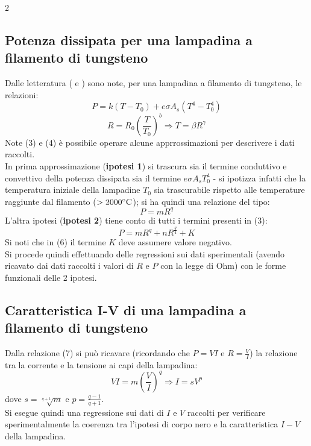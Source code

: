 \documentclass{article}
\begin{document}
\begin{multicols}{2}
\subsection{Potenza dissipata per una lampadina a filamento di tungsteno}
Dalle letteratura (\cite{agrawal} e \cite{clauss}) sono note, per una lampadina a filamento di tungsteno, le relazioni:
\begin{equation}
    P=k(T-T_0)+e\sigma A_s(T^4 - T_0^4)
\end{equation}
\begin{equation}
    R=R_0 (\frac{T}{T_0})^b \Rightarrow T=\beta R^{\gamma}
\end{equation}
Note (3) e (4) è possibile operare alcune apprrossimazioni per descrivere i dati raccolti.\\  
In prima approssimazione (\textbf{ipotesi 1}) si trascura sia il termine conduttivo e convettivo della potenza dissipata sia il termine \(e\sigma A_s T_0^4\) - si ipotizza infatti che la temperatura iniziale della lampadine \(T_0\) sia trascurabile rispetto alle temperature raggiunte dal filamento (\(>  2000 \celsius\)); si ha quindi una relazione del tipo:
\begin{equation}
    P=mR^q
\end{equation}
L'altra ipotesi (\textbf{ipotesi 2}) tiene conto di tutti i termini presenti in (3):
\begin{equation}
    P=mR^q +nR^{\frac{q}{4}}+K
\end{equation}
Si noti che in (6) il termine \(K\) deve assumere valore negativo.\\
Si procede quindi effettuando delle regressioni sui dati sperimentali (avendo ricavato dai dati raccolti i valori di \(R\) e \(P\) con la legge di Ohm) con le forme funzionali delle 2 ipotesi. 
\subsection{Caratteristica I-V di una lampadina a filamento di tungsteno}
Dalla relazione (7) si può ricavare (ricordando che \(P=VI\) e \(R=\frac{V}{I}\)) la relazione tra la corrente e la tensione ai capi della lampadina:
\begin{equation}
VI=m(\frac{V}{I})^q \Rightarrow I=sV^{p}   
\end{equation}
dove \(s=\sqrt[q+1]{m}\) e \(p=\frac{q-1}{q+1}\).\\
Si esegue quindi una regressione sui dati di \(I\) e \(V\) raccolti per verificare sperimentalmente la coerenza tra l'ipotesi di corpo nero e la caratteristica \(I-V\) della lampadina.



\end{multicols}
\end{document}
